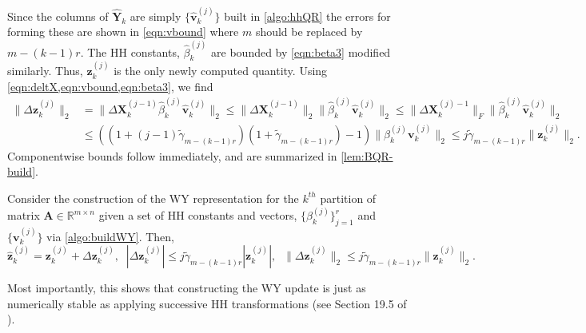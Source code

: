 \documentclass[review,onefignum,onetabnum]{siamart190516}
\newcommand{\R}{\mathbb{R}}
\newcommand{\bb}[1]{\mathbf{#1}}
\begin{document}
Since the columns of $\hat{\bb{Y}}_k$ are simply $\{\hat{\bb{v}}_k^{(j)}\}$ built in \cref{algo:hhQR} the errors for forming these are shown in \cref{eqn:vbound} where $m$ should be replaced by $m-(k-1)r$.
The HH constants, $\hat{\beta}_k^{(j)}$ are bounded by \cref{eqn:beta3} modified similarly. 
Thus, $\bb{z}_k^{(j)}$ is the only newly computed quantity. 
Using \cref{eqn:deltX,eqn:vbound,eqn:beta3}, we find
\begin{align*}
\|\Delta \bb{z}_k^{(j)}\|_2 &= \|\Delta\bb{X}_k^{(j-1)}\hat{\beta}_k^{(j)}\hat{\bb{v}}_k^{(j)} \|_2 \leq \|\Delta\bb{X}_k^{(j-1)}\|_2 \|\hat{\beta}_k^{(j)}\hat{\bb{v}}_k^{(j)}\|_2  \leq \|\Delta\bb{X}_k^{(j)-1}\|_F\|\hat{\beta}_k^{(j)}\hat{\bb{v}}_k^{(j)}\|_2 \\
& \leq \left((1+(j-1)\tilde{\gamma}_{m-(k-1)r})(1 + \tilde{\gamma}_{m-(k-1)r})-1\right) \| \beta_k^{(j)}\bb{v}_k^{(j)}\|_2 \leq j\tilde{\gamma}_{m-(k-1)r}\|\bb{z}_k^{(j)}\|_2.
\end{align*}
Componentwise bounds follow immediately, and are summarized in \cref{lem:BQR-build}.
\begin{lemma}\label{lem:BQR-build}
	Consider the construction of the WY representation for the $k^{th}$ partition of matrix $\bb{A}\in\R^{m\times n}$ given a set of HH constants and vectors, $\{\beta_k^{(j)}\}_{j=1}^r$ and $\{\bb{v}_{k}^{(j)}\}$ via \cref{algo:buildWY}.
	Then, 
	\begin{equation}
	\hat{\bb{z}}_{k}^{(j)} = \bb{z}_{k}^{(j)} + \Delta \bb{z}_{k}^{(j)},\;\; |\Delta \bb{z}_{k}^{(j)}| \leq j\tilde{\gamma}_{m-(k-1)r} |\bb{z}_{k}^{(j)}|,\;\; \|\Delta \bb{z}_k^{(j)}\|_2 \leq j\tilde{\gamma}_{m-(k-1)r}\|\bb{z}_k^{(j)}\|_2.\label{eqn:BQR-z}
	\end{equation}
\end{lemma}
Most importantly, this shows that constructing the WY update is just as numerically stable as applying successive HH transformations (see Section 19.5 of \cite{Higham2002}).
\end{document}
